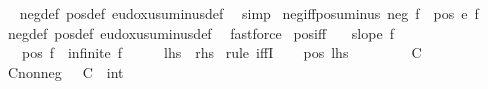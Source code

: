 \begin{isabellebody}
\isadelimproof
\ %
\endisadelimproof
%
\isatagproof
{}\isamarkupfalse%
\ neg{\isacharunderscore}{\kern0pt}def\ pos{\isacharunderscore}{\kern0pt}def\ eudoxus{\isacharunderscore}{\kern0pt}uminus{\isacharunderscore}{\kern0pt}def\ \isamarkupfalse%
\ simp%
\endisatagproof
{\isafoldproof}%
%
\isadelimproof
%
\endisadelimproof
\isanewline
\isanewline
{}\isamarkupfalse%
\ neg{\isacharunderscore}{\kern0pt}iff{\isacharunderscore}{\kern0pt}pos{\isacharunderscore}{\kern0pt}uminus{\isacharcolon}{\kern0pt}\ {\isachardoublequoteopen}neg\ f\ {\isacharequal}{\kern0pt}\ pos\ {\isacharparenleft}{\kern0pt}{\isacharminus}{\kern0pt}\isactrlsub e\ f{\isacharparenright}{\kern0pt}{\isachardoublequoteclose}%
\isadelimproof
\ %
\endisadelimproof
%
\isatagproof
{}\isamarkupfalse%
\ neg{\isacharunderscore}{\kern0pt}def\ pos{\isacharunderscore}{\kern0pt}def\ eudoxus{\isacharunderscore}{\kern0pt}uminus{\isacharunderscore}{\kern0pt}def\ \isamarkupfalse%
\ fastforce%
\endisatagproof
{\isafoldproof}%
%
\isadelimproof
%
\endisadelimproof
\isanewline
\isanewline
{}\isamarkupfalse%
\ pos{\isacharunderscore}{\kern0pt}iff{\isacharcolon}{\kern0pt}\isanewline
\ \ \ {\isachardoublequoteopen}slope\ f{\isachardoublequoteclose}\isanewline
\ \ \ {\isachardoublequoteopen}pos\ f\ {\isacharequal}{\kern0pt}\ infinite\ {\isacharparenleft}{\kern0pt}f\ {\isacharbackquote}{\kern0pt}\ {\isacharbraceleft}{\kern0pt}{}{\isachardot}{\kern0pt}{\isachardot}{\kern0pt}{\isacharbraceright}{\kern0pt}\ {\isasyminter}\ {\isacharbraceleft}{\kern0pt}{}{\isacharless}{\kern0pt}{\isachardot}{\kern0pt}{\isachardot}{\kern0pt}{\isacharbraceright}{\kern0pt}{\isacharparenright}{\kern0pt}{\isachardoublequoteclose}\ {\isacharparenleft}{\kern0pt}\ {\isachardoublequoteopen}{\isacharquery}{\kern0pt}lhs\ {\isacharequal}{\kern0pt}\ {\isacharquery}{\kern0pt}rhs{\isachardoublequoteclose}{\isacharparenright}{\kern0pt}\isanewline
%
\isadelimproof
%
\endisadelimproof
%
\isatagproof
{}\isamarkupfalse%
\ {\isacharparenleft}{\kern0pt}rule\ iffI{\isacharparenright}{\kern0pt}\isanewline
\ \ \isamarkupfalse%
\ pos{\isacharcolon}{\kern0pt}\ {\isacharquery}{\kern0pt}lhs\isanewline
\ \ \isacommand{{\isacharbraceleft}{\kern0pt}}\isamarkupfalse%
\isanewline
\ \ \ \ \isamarkupfalse%
\ C\ \isamarkupfalse%
\ C{\isacharunderscore}{\kern0pt}nonneg{\isacharcolon}{\kern0pt}\ {\isachardoublequoteopen}{}\ {\isasymle}\ {\isacharparenleft}{\kern0pt}C\ {\isacharcolon}{\kern0pt}{\isacharcolon}{\kern0pt}\ int{\isacharparenright}{\kern0pt}{\isachardoublequoteclose}\isanewline

\end{isabellebody}
